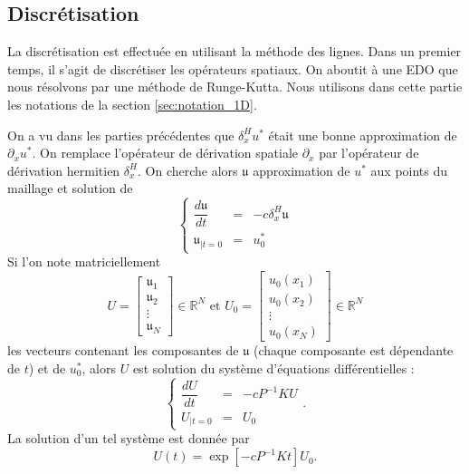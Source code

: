 \subsection{Discrétisation}

La discrétisation est effectuée en utilisant la méthode des lignes. Dans un premier temps, il s'agit de discrétiser les opérateurs spatiaux. On aboutit à une EDO que nous résolvons par une méthode de Runge-Kutta. Nous utilisons dans cette partie les notations de la section \ref{sec:notation_1D}.
 
On a vu dans les parties précédentes que $\delta_x^H u^*$ était une bonne approximation de $\partial_x u^*$. On remplace l'opérateur de dérivation spatiale $\partial_x$ par l'opérateur de dérivation hermitien $\delta_x^H$.
On cherche alors $\mathfrak{u}$ approximation de $u^*$ aux points du maillage et solution de 
\begin{equation}
\left\lbrace
\begin{array}{rcl}
\dfrac{d \mathfrak{u}}{dt} & = & - c \delta_x^H \mathfrak{u} \\
\mathfrak{u}_{|t=0} & = & u_0^*
\end{array}
\right.
\end{equation}
Si l'on note matriciellement 
\begin{equation}
U = \begin{bmatrix}
\mathfrak{u}_1 \\
\mathfrak{u}_2 \\
\vdots \\
\mathfrak{u}_N
\end{bmatrix} \in \mathbb{R}^N \text{ et } U_0 = \begin{bmatrix}
u_0(x_1) \\
u_0(x_2) \\
\vdots \\
u_0(x_N)
\end{bmatrix} \in \mathbb{R}^N
\end{equation}
les vecteurs contenant les composantes de $\mathfrak{u}$ (chaque composante est dépendante de $t$) et de $u_0^*$, alors $U$ est solution du système d'équations différentielles :
\begin{equation}
\left\lbrace
\begin{array}{rcl}
\dfrac{d U}{dt} & = & - c P^{-1}K U \\
U_{|t=0} & = & U_0
\end{array}
\right. .
\end{equation}
La solution d'un tel système est donnée par 
\begin{equation}
U(t) = \exp\left[ - c P^{-1}K t\right] U_0.
\end{equation}

